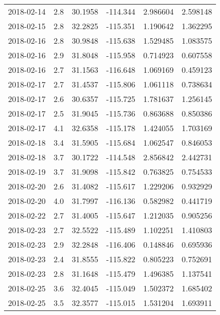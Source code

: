 \begin{tabular}{lrrrrr}
2018-02-14 &       2.8 &  30.1958 &  -114.344 &         2.986604 &         2.598148 \\
2018-02-15 &       2.8 &  32.2825 &  -115.351 &         1.190642 &         1.362295 \\
2018-02-16 &       2.8 &  30.9848 &  -115.638 &         1.529485 &         1.083575 \\
2018-02-16 &       2.9 &  31.8048 &  -115.958 &         0.714923 &         0.607558 \\
2018-02-16 &       2.7 &  31.1563 &  -116.648 &         1.069169 &         0.459123 \\
2018-02-17 &       2.7 &  31.4537 &  -115.806 &         1.061118 &         0.738634 \\
2018-02-17 &       2.6 &  30.6357 &  -115.725 &         1.781637 &         1.256145 \\
2018-02-17 &       2.5 &  31.9045 &  -115.736 &         0.863688 &         0.850386 \\
2018-02-17 &       4.1 &  32.6358 &  -115.178 &         1.424055 &         1.703169 \\
2018-02-18 &       3.4 &  31.5905 &  -115.684 &         1.062547 &         0.846053 \\
2018-02-18 &       3.7 &  30.1722 &  -114.548 &         2.856842 &         2.442731 \\
2018-02-19 &       3.7 &  31.9098 &  -115.842 &         0.763825 &         0.754533 \\
2018-02-20 &       2.6 &  31.4082 &  -115.617 &         1.229206 &         0.932929 \\
2018-02-20 &       4.0 &  31.7997 &  -116.136 &         0.582982 &         0.441719 \\
2018-02-22 &       2.7 &  31.4005 &  -115.647 &         1.212035 &         0.905256 \\
2018-02-23 &       2.7 &  32.5522 &  -115.489 &         1.102251 &         1.410803 \\
2018-02-23 &       2.9 &  32.2848 &  -116.406 &         0.148846 &         0.695936 \\
2018-02-23 &       2.4 &  31.8555 &  -115.822 &         0.805223 &         0.752691 \\
2018-02-23 &       2.8 &  31.1648 &  -115.479 &         1.496385 &         1.137541 \\
2018-02-25 &       3.6 &  32.4045 &  -115.049 &         1.502372 &         1.685402 \\
2018-02-25 &       3.5 &  32.3577 &  -115.015 &         1.531204 &         1.693911 \\

\end{tabular}
